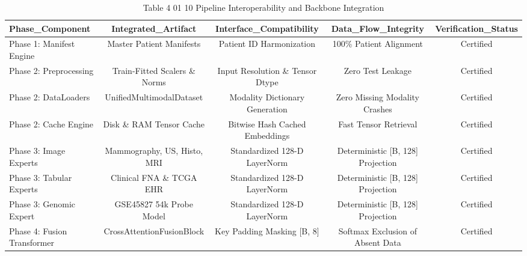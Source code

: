 \begin{table}[htbp]
\centering
\small
\begin{tabular}{lcccc}
\hline
Phase\_Component & Integrated\_Artifact & Interface\_Compatibility & Data\_Flow\_Integrity & Verification\_Status \\
\hline
Phase 1: Manifest Engine & Master Patient Manifests & Patient ID Harmonization & 100\% Patient Alignment & Certified \\
Phase 2: Preprocessing & Train-Fitted Scalers \& Norms & Input Resolution \& Tensor Dtype & Zero Test Leakage & Certified \\
Phase 2: DataLoaders & UnifiedMultimodalDataset & Modality Dictionary Generation & Zero Missing Modality Crashes & Certified \\
Phase 2: Cache Engine & Disk \& RAM Tensor Cache & Bitwise Hash Cached Embeddings & Fast Tensor Retrieval & Certified \\
Phase 3: Image Experts & Mammography, US, Histo, MRI & Standardized 128-D LayerNorm & Deterministic [B, 128] Projection & Certified \\
Phase 3: Tabular Experts & Clinical FNA \& TCGA EHR & Standardized 128-D LayerNorm & Deterministic [B, 128] Projection & Certified \\
Phase 3: Genomic Expert & GSE45827 54k Probe Model & Standardized 128-D LayerNorm & Deterministic [B, 128] Projection & Certified \\
Phase 4: Fusion Transformer & CrossAttentionFusionBlock & Key Padding Masking [B, 8] & Softmax Exclusion of Absent Data & Certified \\
\hline
\end{tabular}
\caption{Table 4 01 10 Pipeline Interoperability and Backbone Integration}
\label{tab:table_4_01_10_pipeline_interoperability_and_backbone_integration}
\end{table}
